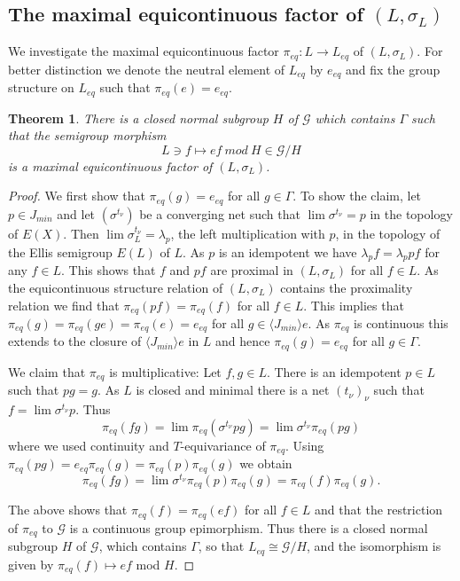 \documentclass[12pt]{amsart}
\newtheorem{theorem}{Theorem}[section]
\theoremstyle{definition}
\numberwithin{equation}{section}
\newcommand{\Gg}{{\mathcal G}}
\newcommand{\pe}{\pi_{eq}}
\begin{document}
\newcommand{\ol}{e_{eq}}

\subsection{The maximal equicontinuous factor of $(L,\sigma_L)$}
We investigate the maximal equicontinuous factor $\pe:L\to L_{eq}$ of $(L,\sigma_L)$. For better distinction we denote the neutral element of $L_{eq}$ by $\ol$ and fix the group structure on $L_{eq}$ such that $\pe(e)=\ol$. 
\begin{theorem}\label{thm:mef}  There is a closed normal subgroup $H$ of $\Gg$ which contains $\Gamma$ such that the semigroup morphism
$$L\ni f \mapsto ef\:mod\:H \in \Gg/H$$
is a maximal equicontinuous factor of $(L,\sigma_L)$.
\end{theorem} 
\begin{proof}
We first show that $\pe(g)=\ol$ for all $g\in \Gamma$. 
To show the claim, let $p\in J_{min}$ and let $(\sigma^{t_\nu})$ be a converging net such that $\lim {\sigma^{t_\nu}} = p$ in the topology of $E(X)$. 
Then $\lim {\sigma_L^{t_\nu}} = \lambda_p$, the left multiplication with $p$, in the topology of the Ellis semigroup $E(L)$ of $L$. As $p$ is an idempotent we have $\lambda_p f = \lambda_p pf$ for any $f\in L$. This shows that $f$ and $pf$ are proximal in $(L,\sigma_L)$ for all $f\in L$.
 As the equicontinuous structure relation of $(L,\sigma_L)$ contains the proximality relation \cite{Auslander1988} we find that $\pe(pf) = \pe(f)$ for  all $f\in L$. This implies that $\pe(g) = \pe(ge) = \pe(e) = \ol$ for all $g\in \langle J_{min} \rangle e$.
As $\pe$ is continuous this extends to the closure of $\langle J_{min} \rangle e$ in $L$ and hence $\pe(g) = \ol$ for all $g\in \Gamma$.

We claim that $\pe$ is multiplicative: Let $f,g\in L$. There is an idempotent $p\in L$ such that $pg=g$. As $L$ is closed and minimal there is a net $(t_\nu)_\nu$ such that $f=\lim \sigma^{t_\nu}p$. Thus
$$\pe(fg) =  \lim \pe(\sigma^{t_\nu} p g) =  \lim \sigma^{t_\nu} \pe(p g)$$
where we used continuity and $T$-equivariance of $\pe$.
Using $ \pe(p g) = \ol \pe(g) = \pe(p)\pe(g)$ we obtain
$$\pe(fg) =\lim \sigma^{t_\nu} \pe(p) \pe(g) = \pe(f)\pe(g). 
$$

The above shows that $\pe(f) = \pe(ef)$ for all $f\in L$ and that 
the restriction of $\pe$ to $\Gg$ is a continuous group epimorphism. 
 Thus there is a closed normal subgroup $H$ of $\Gg$, which contains $\Gamma$, so that $L_{eq} \cong\Gg/H$, and the isomorphism is given by $\pe(f) \mapsto ef$ mod $H$. 
\end{proof}
\end{document}
